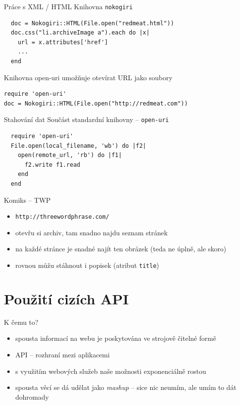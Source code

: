 \documentclass{beamer}
\begin{document}
\begin{frame}[fragile]{Práce s XML / HTML}
  Knihovna \texttt{nokogiri}
  \scriptsize
\begin{verbatim}
  doc = Nokogiri::HTML(File.open("redmeat.html"))
  doc.css("li.archiveImage a").each do |x|
    url = x.attributes['href']
    ...
  end
\end{verbatim}
\end{frame}

\begin{frame}[fragile]{Knihovna open-uri}
umožňuje otevírat URL jako soubory
  \scriptsize
\begin{verbatim}
require 'open-uri'
doc = Nokogiri::HTML(File.open("http://redmeat.com"))
\end{verbatim}
\end{frame}

\begin{frame}[fragile]{Stahování dat}
  Součást standardní knihovny -- \texttt{open-uri}
  \scriptsize
\begin{verbatim}
  require 'open-uri'
  File.open(local_filename, 'wb') do |f2|
    open(remote_url, 'rb') do |f1|
      f2.write f1.read
    end
  end
\end{verbatim}
\end{frame}


\begin{frame}{Komiks -- TWP}
  \begin{itemize}
    \item \texttt{http://threewordphrase.com/}
    \item otevřu si archiv, tam snadno najdu seznam stránek
    \item na každé stránce je snadné najít ten obrázek (teda ne úplně, ale skoro)
    \item rovnou můžu stáhnout i popisek (atribut \texttt{title}) 
  \end{itemize}
\end{frame}


\section{Použití cizích API}

\begin{frame}{K čemu to?}
  \begin{itemize}
    \item spousta informací na webu je poskytována ve strojově čitelné formě
    \item API -- rozhraní mezi aplikacemi 
    \item s využitím webových služeb naše možnosti exponenciálně rostou
    \item spousta věcí se dá udělat jako \emph{mashup} -- sice nic neumím, ale umím to dát dohromady
  \end{itemize}
\end{frame}
\end{document}
